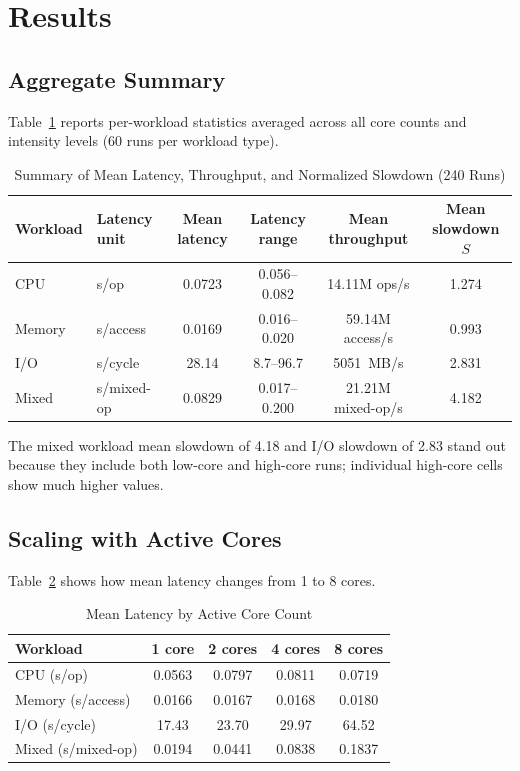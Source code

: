 \documentclass[conference]{IEEEtran}
\begin{document}
\section{Results}
\label{sec:results}

\subsection{Aggregate Summary}

Table~\ref{tab:summary} reports per-workload statistics averaged across all
core counts and intensity levels (60 runs per workload type).

\begin{table}[t]
\caption{Summary of Mean Latency, Throughput, and Normalized Slowdown (240 Runs)}
\label{tab:summary}
\centering
\footnotesize
\setlength{\tabcolsep}{4pt}
\begin{tabular}{llcccc}
\toprule
Workload & Latency unit & Mean latency & Latency range & Mean throughput & Mean slowdown $S$ \\
\midrule
CPU    & \textmu{}s/op        & 0.0723 & 0.056--0.082 & 14.11M ops/s      & 1.274 \\
Memory & \textmu{}s/access    & 0.0169 & 0.016--0.020 & 59.14M access/s   & 0.993 \\
I/O    & \textmu{}s/cycle     & 28.14  & 8.7--96.7    & 5051~MB/s         & 2.831 \\
Mixed  & \textmu{}s/mixed-op  & 0.0829 & 0.017--0.200 & 21.21M mixed-op/s & 4.182 \\
\bottomrule
\end{tabular}
\end{table}

The mixed workload mean slowdown of 4.18 and I/O slowdown of 2.83 stand out
because they include both low-core and high-core runs; individual high-core
cells show much higher values.

\subsection{Scaling with Active Cores}

Table~\ref{tab:corelat} shows how mean latency changes from 1 to 8 cores.

\begin{table}[htbp]
\caption{Mean Latency by Active Core Count}
\label{tab:corelat}
\centering
\begin{tabular}{lcccc}
\toprule
Workload & 1 core & 2 cores & 4 cores & 8 cores \\
\midrule
CPU (\textmu{}s/op)        & 0.0563 & 0.0797 & 0.0811 & 0.0719 \\
Memory (\textmu{}s/access) & 0.0166 & 0.0167 & 0.0168 & 0.0180 \\
I/O (\textmu{}s/cycle)     & 17.43  & 23.70  & 29.97  & 64.52  \\
Mixed (\textmu{}s/mixed-op)& 0.0194 & 0.0441 & 0.0838 & 0.1837 \\
\bottomrule
\end{tabular}
\end{table}
\end{document}
